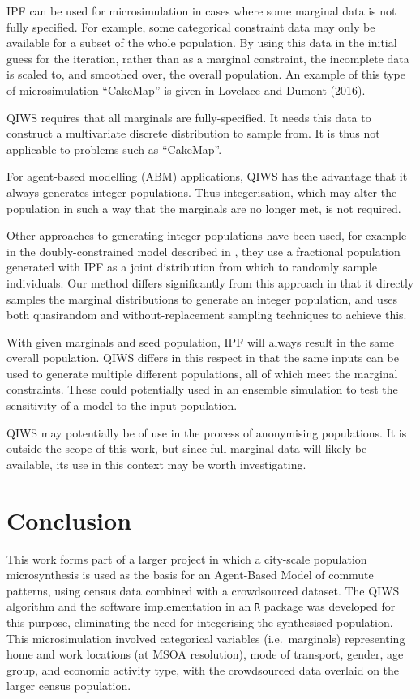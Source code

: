 \documentclass{JASSS}
\begin{document}
IPF can be used for microsimulation in cases where some marginal data is
not fully specified. For example, some categorical constraint data may
only be available for a subset of the whole population. By using this
data in the initial guess for the iteration, rather than as a marginal
constraint, the incomplete data is scaled to, and smoothed over, the
overall population. An example of this type of microsimulation
``CakeMap'' is given in Lovelace and Dumont (2016).

QIWS requires that all marginals are fully-specified. It needs this data
to construct a multivariate discrete distribution to sample from. It is
thus not applicable to problems such as ``CakeMap''.

For agent-based modelling (ABM) applications, QIWS has the advantage
that it always generates integer populations. Thus integerisation, which
may alter the population in such a way that the marginals are no longer
met, is not required.

Other approaches to generating integer populations have been used, for example in the doubly-constrained model described in \cite{lenormand_systematic_2016}, they use a fractional population generated with IPF as a joint distribution from which to randomly sample individuals. Our method differs significantly from this approach in that it directly samples the marginal distributions to generate an integer population, and uses both quasirandom and without-replacement sampling techniques to achieve this.

With given marginals and seed population, IPF will always result in the same overall population. QIWS differs in this respect in that the same inputs can be used to generate multiple different populations, all of which meet the marginal constraints. These could potentially used in an ensemble simulation to test the sensitivity of a model to the input population.

QIWS may potentially be of use in the process of anonymising
populations. It is outside the scope of this work, but since full
marginal data will likely be available, its use in this context may be
worth investigating.

\section{Conclusion}\label{conclusion}

This work forms part of a larger project in which a city-scale
population microsynthesis is used as the basis for an Agent-Based Model
of commute patterns, using census data combined with a crowdsourced
dataset. The QIWS algorithm and the software implementation in an
\texttt{R} package was developed for this purpose, eliminating the need
for integerising the synthesised population. This microsimulation
involved categorical variables (i.e.~marginals) representing home and
work locations (at MSOA resolution), mode of transport, gender, age
group, and economic activity type, with the crowdsourced data overlaid
on the larger census population.
\end{document}
